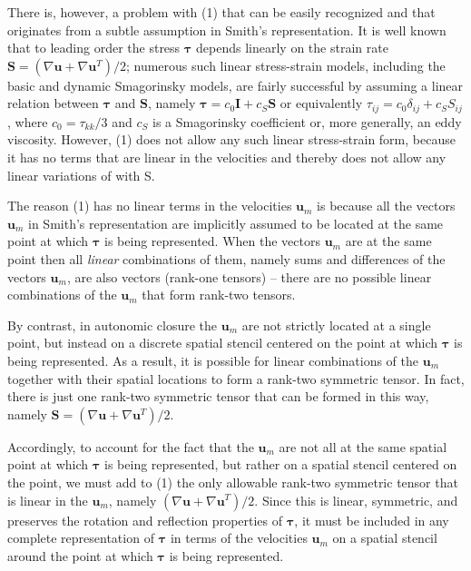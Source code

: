 There is, however, a problem with (1) that can be easily recognized and that originates from a subtle assumption in Smith’s representation.  It is well known that to leading order the stress  $\mathbf{\tau}$ depends linearly on the strain rate $\mathbf{S} = (\nabla \mathbf{u} + \nabla \mathbf{u}^T)/2$; numerous such linear stress-strain models, including the basic and dynamic Smagorinsky models, are fairly successful by assuming a linear relation between $\mathbf{\tau}$  and $\mathbf{S}$, namely $\mathbf{\tau} = c_0\mathbf{I} + c_S \mathbf{S}$  or equivalently $\tau_{ij} = c_0\delta_{ij} + c_S S_{ij}$, where $c_0 = \tau_{kk}/3$  and $c_S$  is a Smagorinsky coefficient or, more generally, an eddy viscosity.  However, (1) does not allow any such linear stress-strain form, because it has no terms that are linear in the velocities   and thereby does not allow any linear variations of   with S.

The reason (1) has no linear terms in the velocities $\mathbf{u}_{m}$ is because all the vectors $\mathbf{u}_{m}$ in Smith’s representation are implicitly assumed to be located at the same point at which $\mathbf{\tau}$  is being represented. When the vectors $\mathbf{u}_{m}$  are at the same point then all \textit{linear} combinations of them, namely sums and differences of the vectors $\mathbf{u}_{m}$, are also vectors (rank-one tensors) – there are no possible linear combinations of the $\mathbf{u}_{m}$ that form rank-two tensors.

By contrast, in autonomic closure the $\mathbf{u}_{m}$  are not strictly located at a single point, but instead on a discrete spatial stencil centered on the point at which $\mathbf{\tau}$  is being represented.  As a result, it is possible for linear combinations of the $\mathbf{u}_{m}$  together with their spatial locations to form a rank-two symmetric tensor. In fact, there is just one rank-two symmetric tensor that can be formed in this way, namely $\mathbf{S} = (\nabla \mathbf{u} + \nabla \mathbf{u}^T)/2$.

Accordingly, to account for the fact that the $\mathbf{u}_{m}$ are not all at the same spatial point at which $\mathbf{\tau}$ is being represented, but rather on a spatial stencil centered on the point, we must add to (1) the only allowable rank-two symmetric tensor that is linear in the $\mathbf{u}_{m}$, namely $(\nabla \mathbf{u} + \nabla \mathbf{u}^T)/2$. Since this is linear, symmetric, and preserves the rotation and reflection properties of $\mathbf{\tau}$, it must be included in any complete representation of  $\mathbf{\tau}$ in terms of the velocities $\mathbf{u}_{m}$ on a spatial stencil around the point at which $\mathbf{\tau}$ is being represented.

